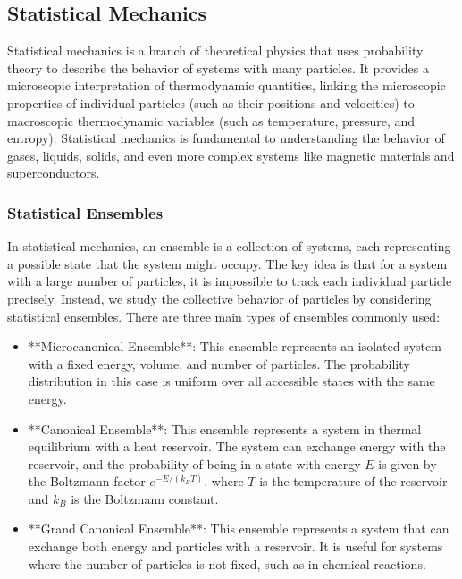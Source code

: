 \documentclass{article}
\begin{document}
\subsection{Statistical Mechanics}

Statistical mechanics is a branch of theoretical physics that uses probability theory to describe the behavior of systems with many particles. It provides a microscopic interpretation of thermodynamic quantities, linking the microscopic properties of individual particles (such as their positions and velocities) to macroscopic thermodynamic variables (such as temperature, pressure, and entropy). Statistical mechanics is fundamental to understanding the behavior of gases, liquids, solids, and even more complex systems like magnetic materials and superconductors.

\subsubsection*{Statistical Ensembles}

In statistical mechanics, an ensemble is a collection of systems, each representing a possible state that the system might occupy. The key idea is that for a system with a large number of particles, it is impossible to track each individual particle precisely. Instead, we study the collective behavior of particles by considering statistical ensembles. There are three main types of ensembles commonly used:

\begin{itemize}
    \item **Microcanonical Ensemble**: This ensemble represents an isolated system with a fixed energy, volume, and number of particles. The probability distribution in this case is uniform over all accessible states with the same energy.
    \item **Canonical Ensemble**: This ensemble represents a system in thermal equilibrium with a heat reservoir. The system can exchange energy with the reservoir, and the probability of being in a state with energy \( E \) is given by the Boltzmann factor \( e^{-E/(k_B T)} \), where \( T \) is the temperature of the reservoir and \( k_B \) is the Boltzmann constant.
    \item **Grand Canonical Ensemble**: This ensemble represents a system that can exchange both energy and particles with a reservoir. It is useful for systems where the number of particles is not fixed, such as in chemical reactions.
\end{itemize}
\end{document}
